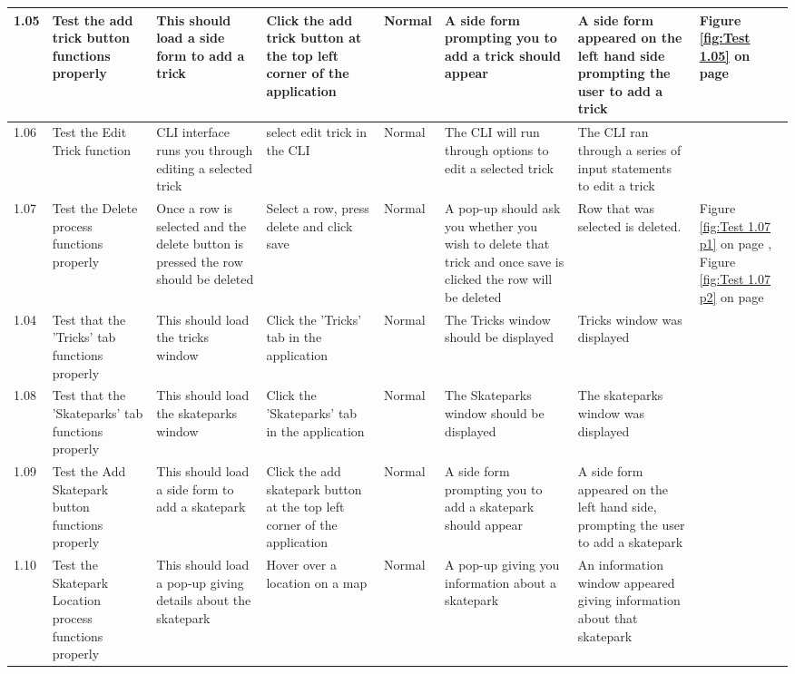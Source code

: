 \begin{landscape}
\begin{center}
\begin{longtable}{|p{1.5cm}|p{2.5cm}|p{2.5cm}|p{2cm}|p{2cm}|p{2cm}|p{2cm}|p{2cm}|}
1.05 & Test the add trick button functions properly & This should load a side form to add a trick & Click the add trick button at the top left corner of the application & Normal & A side form prompting you to add a trick should appear & A side form appeared on the left hand side prompting the user to add a trick & Figure \ref{fig:Test 1.05} on page \pageref{fig:Test 1.05} \\ \hline

1.06 & Test the Edit Trick function & CLI interface runs you through editing a selected trick & select edit trick in the CLI & Normal & The CLI will run through options to edit a selected trick & The CLI ran through a series of input statements to edit a trick &  \\ \hline

1.07 & Test the Delete process functions properly & Once a row is selected and the delete button is pressed the row should be deleted & Select a row, press delete and click save & Normal & A pop-up should ask you whether you wish to delete that trick and once save is clicked the row will be deleted & Row that was selected is deleted. & Figure \ref{fig:Test 1.07 p1} on page \pageref{fig:Test 1.07 p1}, Figure \ref{fig:Test 1.07 p2} on page \pageref{fig:Test 1.07 p2}  \\ \hline

1.04 & Test that the 'Tricks' tab functions properly & This should load the tricks window & Click the 'Tricks' tab in the application & Normal & The Tricks window should be displayed & Tricks window was displayed & \\ \hline

1.08 & Test that the 'Skateparks' tab functions properly & This should load the skateparks window &Click the 'Skateparks' tab in the application & Normal & The Skateparks window should be displayed & The skateparks window was displayed & \\ \hline

1.09 & Test the Add Skatepark button functions properly &  This should load a side form to add a skatepark & Click the add skatepark button at the top left corner of the application & Normal & A side form prompting you to add a skatepark should appear & A side form appeared on the left hand side, prompting the user to add a skatepark &  \\ \hline

1.10 & Test the Skatepark Location process functions properly & This should load a pop-up giving details about the skatepark & Hover over a location on a map & Normal & A pop-up giving you information about a skatepark & An information window appeared giving information about that skatepark & \\ \hline


\end{longtable}
\end{center}
\end{landscape}

